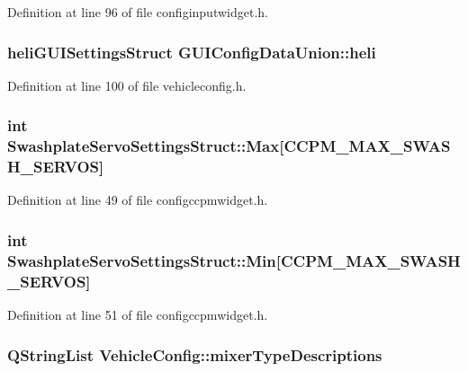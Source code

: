 \-Definition at line 96 of file configinputwidget.\-h.

\hypertarget{group___config_plugin_gae9da8787d8f36ea6650045cf28c3b40d}{
\subsubsection[{heli}]{\setlength{\rightskip}{0pt plus 5cm}heli\-G\-U\-I\-Settings\-Struct {\bf \-G\-U\-I\-Config\-Data\-Union\-::heli}}}\label{group___config_plugin_gae9da8787d8f36ea6650045cf28c3b40d}


\-Definition at line 100 of file vehicleconfig.\-h.

\hypertarget{group___config_plugin_ga30259c7dfef707f2d0999fed8adaf6b1}{
\subsubsection[{\-Max}]{\setlength{\rightskip}{0pt plus 5cm}int {\bf \-Swashplate\-Servo\-Settings\-Struct\-::\-Max}\mbox{[}\-C\-C\-P\-M\-\_\-\-M\-A\-X\-\_\-\-S\-W\-A\-S\-H\-\_\-\-S\-E\-R\-V\-O\-S\mbox{]}}}\label{group___config_plugin_ga30259c7dfef707f2d0999fed8adaf6b1}


\-Definition at line 49 of file configccpmwidget.\-h.

\hypertarget{group___config_plugin_ga68b64812e9062f2c280eebb8ad8961c4}{
\subsubsection[{\-Min}]{\setlength{\rightskip}{0pt plus 5cm}int {\bf \-Swashplate\-Servo\-Settings\-Struct\-::\-Min}\mbox{[}\-C\-C\-P\-M\-\_\-\-M\-A\-X\-\_\-\-S\-W\-A\-S\-H\-\_\-\-S\-E\-R\-V\-O\-S\mbox{]}}}\label{group___config_plugin_ga68b64812e9062f2c280eebb8ad8961c4}


\-Definition at line 51 of file configccpmwidget.\-h.

\hypertarget{group___config_plugin_ga05f4cbfd3c5b0fcc642f17003888459a}{
\subsubsection[{mixer\-Type\-Descriptions}]{\setlength{\rightskip}{0pt plus 5cm}\-Q\-String\-List {\bf \-Vehicle\-Config\-::mixer\-Type\-Descriptions}}}\label{group___config_plugin_ga05f4cbfd3c5b0fcc642f17003888459a}


